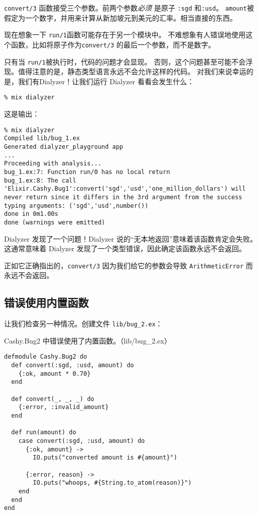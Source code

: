 \texttt{convert/3} 函数接受三个参数。前两个参数\emph{必须} 是原子 \texttt{:sgd} 和\texttt{:usd}。
\texttt{amount}被假定为一个数字，并用来计算从新加坡元到美元的汇率。相当直接的东西。

现在想象一下 \texttt{run/1}函数可能存在于另一个模块中。
不难想象有人错误地使用这个函数，比如将原子作为\texttt{convert/3} 的最后一个参数，而不是数字。

只有当 \texttt{run/1}被执行时，代码的问题才会显现。
否则，这个问题甚至可能不会浮现。值得注意的是，静态类型语言永远不会允许这样的代码。
对我们来说幸运的是，我们有Dialyzer！让我们运行 Dialyzer 看看会发生什么：

\begin{code}{}
\begin{verbatim}
% mix dialyzer
\end{verbatim}
\end{code}

这是输出：

\begin{code}{}
\begin{verbatim}
% mix dialyzer
Compiled lib/bug_1.ex
Generated dialyzer_playground app
...
Proceeding with analysis...
bug_1.ex:7: Function run/0 has no local return
bug_1.ex:8: The call 'Elixir.Cashy.Bug1':convert('sgd','usd','one_million_dollars') will never return since it differs in the 3rd argument from the success typing arguments: ('sgd','usd',number())
done in 0m1.00s
done (warnings were emitted)
\end{verbatim}
\end{code}

Dialyzer 发现了一个问题！Dialyzer
说的``无本地返回''意味着该函数肯定会失败。这通常意味着 Dialyzer
发现了一个类型错误，因此确定该函数永远不会返回。

正如它正确指出的，\texttt{convert/3}
因为我们给它的参数会导致 \texttt{ArithmeticError}
而永远不会返回。


\subsection{错误使用内置函数}

让我们检查另一种情况。创建文件 \texttt{lib/bug\_2.ex}：

\begin{code}{Cashy.Bug2 中错误使用了内置函数。（lib/bug\_2.ex）}

\begin{verbatim}
defmodule Cashy.Bug2 do
  def convert(:sgd, :usd, amount) do
    {:ok, amount * 0.70}
  end

  def convert(_, _, _) do
    {:error, :invalid_amount}
  end

  def run(amount) do
    case convert(:sgd, :usd, amount) do
      {:ok, amount} ->
        IO.puts("converted amount is #{amount}")

      {:error, reason} ->
        IO.puts("whoops, #{String.to_atom(reason)}")
    end
  end
end
\end{verbatim}
\end{code}

